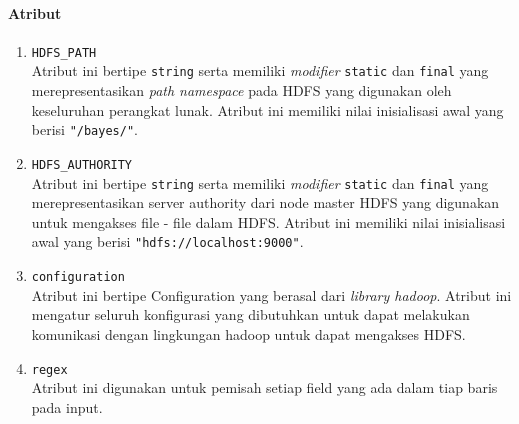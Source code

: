 	\paragraph{Atribut}
		\begin{enumerate}
			\item \verb|HDFS_PATH|\\
			Atribut ini bertipe \texttt{string} serta memiliki \textit{modifier} \texttt{static} dan \texttt{final} yang merepresentasikan \textit{path namespace} pada HDFS yang digunakan oleh keseluruhan perangkat lunak. Atribut ini memiliki nilai inisialisasi awal yang berisi \texttt{"/bayes/"}.

			\item \verb|HDFS_AUTHORITY|\\
			Atribut ini bertipe \texttt{string} serta memiliki \textit{modifier} \texttt{static} dan \texttt{final} yang merepresentasikan server authority dari node master HDFS yang digunakan untuk mengakses file - file dalam HDFS. Atribut ini memiliki nilai inisialisasi awal yang berisi \texttt{"hdfs://localhost:9000"}.

			\item \verb|configuration|\\
			Atribut ini bertipe Configuration yang berasal dari \textit{library hadoop}. Atribut ini mengatur seluruh konfigurasi yang dibutuhkan untuk dapat melakukan komunikasi dengan lingkungan hadoop untuk dapat mengakses HDFS.

			\item \verb|regex|\\
			Atribut ini digunakan untuk pemisah setiap field yang ada dalam tiap baris pada input.
			
		\end{enumerate}				


